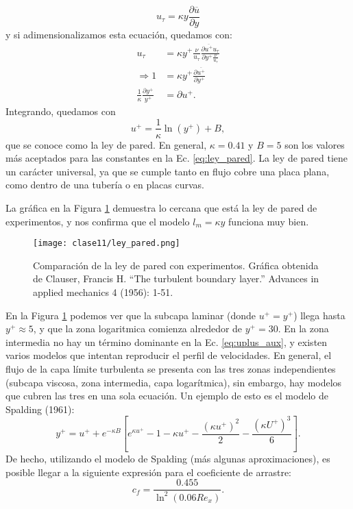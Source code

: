 %
\begin{equation}
u_\tau = \kappa y \frac{\partial\overline{u}}{\partial y}
\end{equation}
%
y si adimensionalizamos esta ecuación, quedamos con:
%
\begin{align}
u_\tau &= \kappa y^+\frac{\nu}{u_\tau} \frac{\partial\overline{u^+}u_\tau}{\partial y^+ \frac{\nu}{u_\tau}}\nonumber\\
\Rightarrow 1&= \kappa y^+ \frac{\partial\overline{u^+}}{\partial y^+}\nonumber\\
\frac{1}{\kappa}\frac{\partial y^+}{y^+} &= \partial u^+.
\end{align}
%
Integrando, quedamos con
%
\begin{equation}\label{eq:ley_pared}
u^+ = \frac{1}{\kappa}\ln(y^+) + B,
\end{equation}
%
que se conoce como la ley de pared.
En general, $\kappa=0.41$ y $B=5$ son los valores más aceptados para las constantes en la Ec. \eqref{eq:ley_pared}.
La ley de pared tiene un carácter universal, ya que se cumple tanto en flujo cobre una placa plana, como dentro de una tubería o en placas curvas.

La gráfica en la Figura \ref{fig:ley_pared} demuestra lo cercana que está la ley de pared de experimentos, y nos confirma que el modelo $l_m = \kappa y$ funciona muy bien.
%
\begin{figure}
\centering
\texttt{[image: clase11/ley\_pared.png]}
\caption{Comparación de la ley de pared con experimentos. Gráfica obtenida de Clauser, Francis H. ``The turbulent boundary layer.'' Advances in applied mechanics 4 (1956): 1-51.}
\label{fig:ley_pared}
\end{figure}

En la Figura \ref{fig:ley_pared} podemos ver que la subcapa laminar (donde $u^+=y^+$) llega hasta $y^+\approx5$, y que la zona logaritmica comienza alrededor de $y^+=30$.
En la zona intermedia no hay un término dominante en la Ec. \eqref{eq:uplus_aux}, y existen varios modelos que intentan reproducir el perfil de velocidades.
En general, el flujo de la capa límite turbulenta se presenta con las tres zonas independientes (subcapa viscosa, zona intermedia, capa logarítmica), sin embargo, hay modelos que cubren las tres en una sola ecuación.
Un ejemplo de esto es el modelo de Spalding (1961):
%
\begin{equation}\label{eq:spalding}
y^+ = u^+ + e^{-\kappa B}\left[e^{\kappa u^+} -1 -\kappa u^+ -\frac{(\kappa u^+)^2}{2} - \frac{(\kappa U^+)^3}{6}\right].
\end{equation}
%
De hecho, utilizando el modelo de Spalding (más algunas aproximaciones), es posible llegar a la siguiente expresión para el coeficiente de arrastre:
%
\begin{equation}\label{eq:cf}
c_f = \frac{0.455}{\ln^2(0.06 Re_x)}.
\end{equation}

